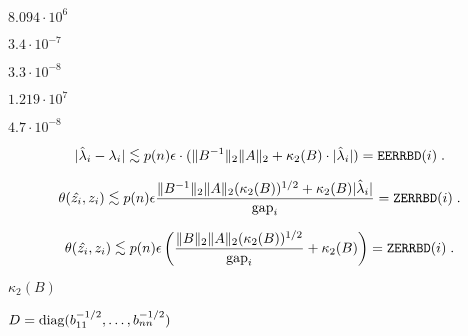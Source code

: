 {\newpage\clearpage
{}%
$8.094 \cdot 10^6$%
\lthtmlinlinemathZ
\lthtmlcheckvsize\clearpage}

{\newpage\clearpage
{}%
$3.4 \cdot 10^{-7}$%
\lthtmlinlinemathZ
\lthtmlcheckvsize\clearpage}

{\newpage\clearpage
{}%
$3.3 \cdot 10^{-8}$%
\lthtmlinlinemathZ
\lthtmlcheckvsize\clearpage}

{\newpage\clearpage
{}%
$1.219 \cdot 10^7$%
\lthtmlinlinemathZ
\lthtmlcheckvsize\clearpage}

{\newpage\clearpage
{}%
$4.7 \cdot 10^{-8}$%
\lthtmlinlinemathZ
\lthtmlcheckvsize\clearpage}

{\newpage\clearpage
{}%
\begin{displaymath}
|\hat{\lambda}_i - \lambda_i | \mathrel{\raisebox{-.75ex}{$\mathop{\sim}\limits^{\textstyle <}$}}p(n) \epsilon
\cdot ( \|B^{-1}\|_2 \|A\|_2  + \kappa_2 (B) \cdot | \hat{\lambda}_i | )
 = {\tt EERRBD}(i) \; .
\end{displaymath}%
\lthtmldisplayZ
\lthtmlcheckvsize\clearpage}

{\newpage\clearpage
{}%
\begin{displaymath}
\theta ( \hat{z_i} , z_i ) \mathrel{\raisebox{-.75ex}{$\mathop{\sim}\limits^{\textstyle <}$}}
p(n) \epsilon
\frac{\|B^{-1} \|_2 \|A\|_2 ( \kappa_2 (B) )^{1/2}
+ \kappa_2 (B) | \hat{\lambda}_i |}
{ {\rm gap}_i } = {\tt ZERRBD}(i) \; .
\end{displaymath}%
\lthtmldisplayZ
\lthtmlcheckvsize\clearpage}

{\newpage\clearpage
{}%
\begin{displaymath}
\theta ( \hat{z_i} ,  z_i ) \mathrel{\raisebox{-.75ex}{$\mathop{\sim}\limits^{\textstyle <}$}}
p(n) \epsilon \left(
\frac{\|B\|_2 \|A\|_2 ( \kappa_2 (B) )^{1/2}}
{ {\rm gap}_i }
+ \kappa_2 (B) \right) = {\tt ZERRBD}(i) \; .
\end{displaymath}%
\lthtmldisplayZ
\lthtmlcheckvsize\clearpage}

{\newpage\clearpage
{}%
$\kappa_2 (B)$%
\lthtmlinlinemathZ
\lthtmlcheckvsize\clearpage}

{\newpage\clearpage
{}%
$D = {\mbox {\rm diag}}(b_{11}^{-1/2} , \ldots , b_{nn}^{-1/2})$%
\lthtmlinlinemathZ
\lthtmlcheckvsize\clearpage}

